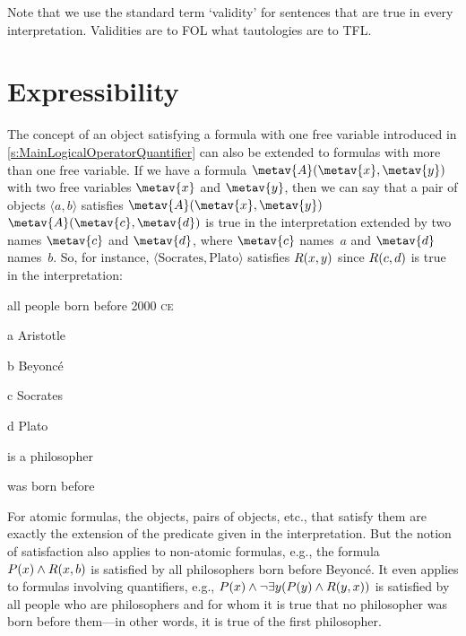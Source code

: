Note that we use the standard term `validity' for sentences that are
true in every interpretation. Validities are to FOL what tautologies
are to TFL.

\section{Expressibility}

The concept of an object satisfying a formula with one free variable
introduced in \cref{s:MainLogicalOperatorQuantifier} can also be
extended to formulas with more than one free variable. If we have a
formula $\metav{A}(\metav{x},\metav{y})$ with two free variables
$\metav{x}$ and $\metav{y}$, then we can say that a pair of objects
$\langle a, b\rangle$ satisfies $\metav{A}(\metav{x},\metav{y})$
\ifeff{} $\metav{A}(\metav{c},\metav{d})$ is true in the
interpretation extended by two names $\metav{c}$ and $\metav{d}$,
where $\metav{c}$ names~$a$ and $\metav{d}$ names~$b$. So, for
instance, $\langle \text{Socrates}, \text{Plato}\rangle$ satisfies
$\mathord{R}(x,y)$ since $\mathord{R}(c,d)$ is true in the interpretation:
\begin{ekey}
	\item[\text{domain}] all people born before 2000 \textsc{ce}
	\item[a] Aristotle
	\item[b] Beyonc\'e
	\item[c] Socrates
	\item[d] Plato
	\item[\atom{P}{x}]  is a philosopher
	\item[\atom{R}{x,y}]  was born before 
\end{ekey}
For atomic formulas, the objects, pairs of objects, etc., that satisfy them are exactly the extension of the predicate given in the interpretation. But the notion of satisfaction also applies to non-atomic formulas, e.g., the formula $\mathord{P}(x) \land \mathord{R}(x,b)$ is satisfied by all philosophers born before Beyonc\'e. It even applies to formulas involving quantifiers, e.g., $\mathord{P}(x) \wedge \lnot\exists y(\mathord{P}(y) \land \mathord{R}(y,x))$ is satisfied by all people who are philosophers and for whom it is true that no philosopher was born before them---in other words, it is true of the first philosopher.

